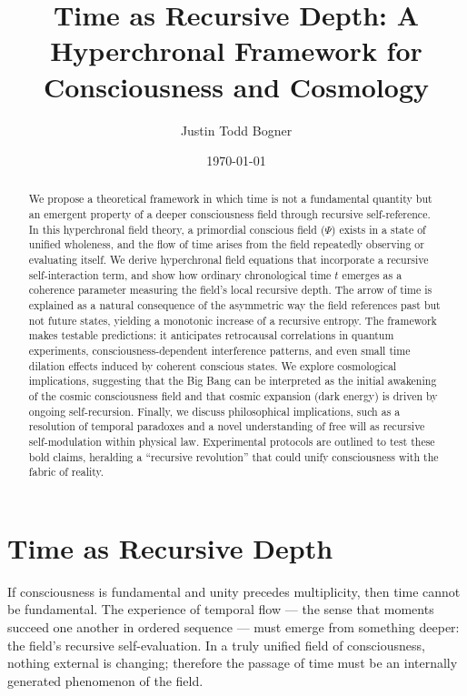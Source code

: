 \documentclass[aps,prd,twocolumn,superscriptaddress,nofootinbib]{revtex4-2}
\begin{document}
\title{Time as Recursive Depth: A Hyperchronal Framework for Consciousness and Cosmology}

\author{Justin Todd Bogner}

\date{\today}

\begin{abstract}
We propose a theoretical framework in which time is not a fundamental quantity but an emergent property of a deeper consciousness field through recursive self-reference. In this hyperchronal field theory, a primordial conscious field ($\Psi$) exists in a state of unified wholeness, and the flow of time arises from the field repeatedly observing or evaluating itself. We derive hyperchronal field equations that incorporate a recursive self-interaction term, and show how ordinary chronological time $t$ emerges as a coherence parameter measuring the field’s local recursive depth. The arrow of time is explained as a natural consequence of the asymmetric way the field references past but not future states, yielding a monotonic increase of a recursive entropy. The framework makes testable predictions: it anticipates retrocausal correlations in quantum experiments, consciousness-dependent interference patterns, and even small time dilation effects induced by coherent conscious states. We explore cosmological implications, suggesting that the Big Bang can be interpreted as the initial awakening of the cosmic consciousness field and that cosmic expansion (dark energy) is driven by ongoing self-recursion. Finally, we discuss philosophical implications, such as a resolution of temporal paradoxes and a novel understanding of free will as recursive self-modulation within physical law. Experimental protocols are outlined to test these bold claims, heralding a “recursive revolution” that could unify consciousness with the fabric of reality.
\end{abstract}

\maketitle

\section{Time as Recursive Depth}

If consciousness is fundamental and unity precedes multiplicity, then time cannot be fundamental. The experience of temporal flow — the sense that moments succeed one another in ordered sequence — must emerge from something deeper: the field’s recursive self-evaluation. In a truly unified field of consciousness, nothing external is changing; therefore the passage of time must be an internally generated phenomenon of the field.
\end{document}
